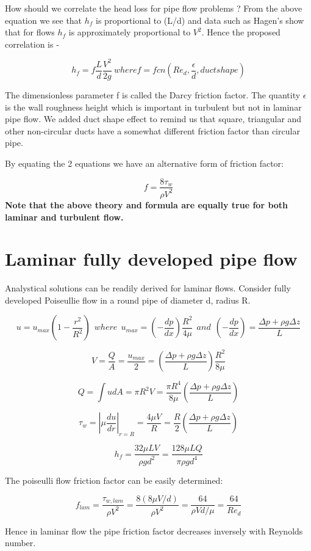 \documentclass{report}
\begin{document}
How should we correlate the head loss for pipe flow problems ? From the above equation we see that \(h_f\) is
proportional to (L/d) and data such as Hagen's show that for flows \(h_f\) is approximately proportional to
\(V^2\). Hence the proposed correlation is - 

\begin{tcolorbox}[colback=pink!30!white, colframe=black, width=\textwidth, boxrule=0.5mm, sharp corners, left=1mm, right=1mm, top=1mm, bottom=1mm]
    \[
   h_f = f \frac{L}{d} \frac{V^2}{2g} \ where f=fcn(Re_d, \frac{\epsilon}{d}, duct shape)\]
\end{tcolorbox}
The dimensionless parameter f is called the Darcy friction factor. The quantity \(\epsilon\) is the wall roughness height which is important in
turbulent but not in laminar pipe flow. We added duct shape effect to remind us that square, triangular and other non-circular ducts have a somewhat different
friction factor than circular pipe.

By equating the 2 equations we have an alternative form of friction factor:

\[ f = \frac{8 \tau_w}{\rho V^2}\]
\textbf{Note that the above theory and formula are equally true for both laminar and turbulent flow.}

\section{Laminar fully developed pipe flow}
Analystical solutions can be readily derived for laminar flows. Consider fully developed Poiseullie flow in a 
round pipe of diameter d, radius R.

\[ u = u_{max}\left( 1 -\frac{r^2}{R^2}\right) \ \ where \ \ u_{max} = \left( - \frac{dp}{dx} \right) \frac{R^2}{4\mu} \ \ and \ \ \left( -\frac{dp}{dx}\right) = \frac{\Delta p + \rho g\Delta z}{L} \]

\[V=\frac{Q}{A} = \frac{u_{max}}{2} = \left(\frac{\Delta p + \rho g\Delta z}{L} \right) \frac{R^2}{8\mu}\]

\[ Q = \int udA = \pi R^2 V = \frac{\pi R^4}{8 \mu} \left(\frac{\Delta p + \rho g\Delta z}{L} \right) \]

\[ \tau_w = \left| \mu \frac{du}{dr} \right|_{r=R} = \frac{4 \mu V}{R} = \frac{R}{2} \left(\frac{\Delta p + \rho g\Delta z}{L} \right)\]

\[ h_f = \frac{ 32 \mu LV}{\rho g d^2} = \frac{128 \mu L Q}{\pi \rho g d^4}\]

The poiseulli flow friction factor can be easily determined:
\begin{tcolorbox}[colback=pink!30!white, colframe=black, width=\textwidth, boxrule=0.5mm, sharp corners, left=1mm, right=1mm, top=1mm, bottom=1mm]
    \[
  f_{lam} = \frac{\tau_{w, lam}}{\rho V^2} = \frac{8(8\mu V/d)}{\rho V^2} = \frac{64}{\rho Vd /\mu} = \frac{64}{Re_d}\]
\end{tcolorbox}
Hence in laminar flow the pipe friction factor decreases inversely with Reynolds number.
\end{document}
